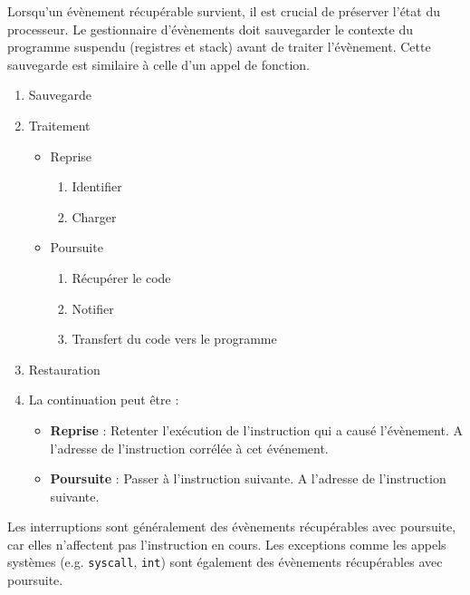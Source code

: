 Lorsqu'un évènement récupérable survient, il est crucial de préserver l'état du processeur. 
Le gestionnaire d'évènements doit sauvegarder le contexte du programme suspendu (registres et stack) avant de traiter l'évènement.
Cette sauvegarde est similaire à celle d'un appel de fonction.


\begin{enumerate}
    \item Sauvegarde
    \item Traitement
    \begin{itemize}
        \item Reprise
        \begin{enumerate}
            \item Identifier
            \item Charger
        \end{enumerate}
        \item Poursuite
        \begin{enumerate}
            \item Récupérer le code
            \item Notifier
            \item Transfert du code vers le programme
        \end{enumerate}
    \end{itemize}
    \item Restauration
    \item La continuation peut être :
    \begin{itemize}
        \item \textbf{Reprise} : Retenter l'exécution de l'instruction qui a causé l'évènement.
        A l'adresse de l'instruction corrélée à cet événement.
        \item \textbf{Poursuite} : Passer à l'instruction suivante.
        A l'adresse de l'instruction suivante.
    \end{itemize}
\end{enumerate}

Les interruptions sont généralement des évènements récupérables avec poursuite, car elles n'affectent pas l'instruction en cours. 
Les exceptions comme les appels systèmes (e.g. \texttt{syscall}, \texttt{int}) sont également des évènements récupérables avec poursuite.

